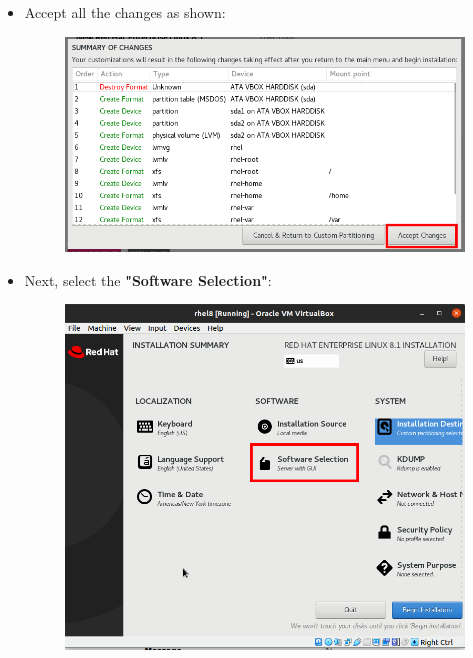 \begin{flushleft}
\begin{itemize}
 	\item Accept all the changes as shown:
	\begin{figure}[h!]
		\centering
		\includegraphics[scale=.3]{content/chapter18/images/accept.png}
	\end{figure}		

	\newpage
	\item Next, select the \textbf{"Software Selection"}:
	\begin{figure}[h!]
		\centering
		\includegraphics[scale=.3]{content/chapter18/images/server1.png}
	\end{figure}		
	

\end{itemize}
\end{flushleft}
